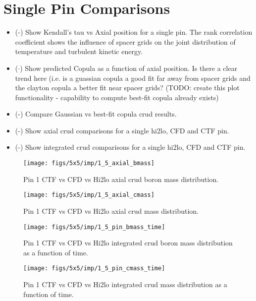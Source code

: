 \section{Single Pin Comparisons}

\begin{itemize}
    \item (\checkmark-) Show Kendall's tau vs Axial position for a single pin.  The rank correlation coefficient shows
    the influence of spacer grids on the joint distribution of temperature and turbulent kinetic energy.
    \item ($\cdot$) Show predicted Copula as a function of axial position.  Is there a clear trend here (i.e. is a guassian copula
    a good fit far away from spacer grids and the clayton copula a better fit near spacer grids?  (TODO: create this plot functionality - capability to compute best-fit copula already exists)
    \item (\checkmark-) Compare Gaussian vs best-fit copula crud results.
    \item (\checkmark-) Show axial crud comparisons for a single hi2lo, CFD and CTF pin.
    \item (\checkmark-) Show integrated crud comparisons for a single hi2lo, CFD and CTF pin.
\end{itemize}

\begin{figure}[H]
    \centering
    \texttt{[image: figs/5x5/imp/1\_5\_axial\_bmass]}
    \caption{Pin 1 CTF vs CFD vs Hi2lo axial crud boron mass distribution.}
    \label{fig:15axialbmass}
\end{figure}
\begin{figure}[H]
    \centering
    \texttt{[image: figs/5x5/imp/1\_5\_axial\_cmass]}
    \caption{Pin 1 CTF vs CFD vs Hi2lo axial crud mass distribution.}
    \label{fig:15axialcmass}
\end{figure}
\begin{figure}[H]
    \centering
    \texttt{[image: figs/5x5/imp/1\_5\_pin\_bmass\_time]}
    \caption{Pin 1 CTF vs CFD vs Hi2lo integrated crud boron mass distribution as a function of time.}
    \label{fig:15pinbmasstime}
\end{figure}
\begin{figure}[H]
    \centering
    \texttt{[image: figs/5x5/imp/1\_5\_pin\_cmass\_time]}
    \caption{Pin 1 CTF vs CFD vs Hi2lo integrated crud mass distribution as a function of time.}
    \label{fig:15pincmasstime}
\end{figure}

